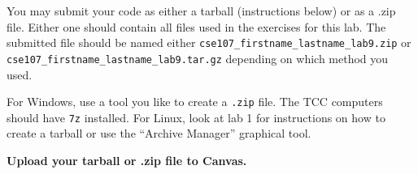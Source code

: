 \documentclass[11pt]{cselabheader}
\begin{document}
You may submit your code as either a tarball (instructions below) or as a .zip
file. Either one should contain all files used in the exercises for this lab.
The submitted file should be named either
\texttt{cse107\_firstname\_lastname\_lab9.zip} or
\texttt{cse107\_firstname\_lastname\_lab9.tar.gz} depending on which method you
used.

For Windows, use a tool you like to create a \texttt{.zip} file. The TCC
computers should have \texttt{7z} installed. For Linux, look at lab 1 for
instructions on how to create a tarball or use the ``Archive Manager'' graphical
tool.

\begin{center}
  \textbf{Upload your tarball or .zip file to Canvas.}
\end{center}
\end{document}
